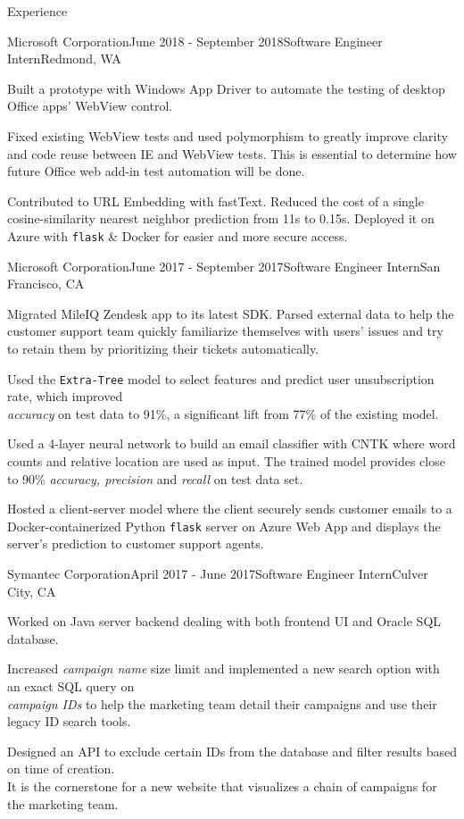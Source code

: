 \documentclass{resume} %
\begin{document}
\begin{rSection}{Experience}

\begin{rSubsection}{Microsoft Corporation}{June 2018 - September 2018}{Software Engineer Intern}{Redmond, WA}
\item Built a prototype with Windows App Driver to automate the testing of desktop Office apps' WebView control.
\item Fixed existing WebView tests and used polymorphism to greatly improve clarity and code reuse between IE and WebView tests. This is essential to determine how future Office web add-in test automation will be done.
\item Contributed to URL Embedding with fastText. Reduced the cost of a single cosine-similarity nearest neighbor prediction from 11s to 0.15s. Deployed it on Azure with \texttt{flask} \& Docker for easier and more secure access.
\end{rSubsection}

\begin{rSubsection}{Microsoft Corporation}{June 2017 - September 2017}{Software Engineer Intern}{San Francisco, CA}
\item Migrated MileIQ Zendesk app to its latest SDK. Parsed external data to help the customer support team quickly familiarize themselves with users' issues and try to retain them by prioritizing their tickets automatically.
\item Used the \texttt{Extra-Tree} model to select features and predict user unsubscription rate, which improved\\
\textit{accuracy} on test data to 91\%, a significant lift from 77\% of the existing model.
\item Used a 4-layer neural network to build an email classifier with CNTK where word counts and relative location are used as input. The trained model provides close to 90\% \textit{accuracy, precision} and \textit{recall} on test data set.
\item Hosted a client-server model where the client securely sends customer emails to a Docker-containerized Python \texttt{flask} server on Azure Web App and displays the server's prediction to customer support agents.
\end{rSubsection}

\begin{rSubsection}{Symantec Corporation}{April 2017 - June 2017}{Software Engineer Intern}{Culver City, CA}
\item Worked on Java server backend dealing with both frontend UI and Oracle SQL database.
\item Increased \textit{campaign name} size limit and implemented a new search option with an exact SQL query on\\ 
\textit{campaign IDs} to help the marketing team detail their campaigns and use their legacy ID search tools.
\item Designed an API to exclude certain IDs from the database and filter results based on time of creation.\\
It is the cornerstone for a new website that visualizes a chain of campaigns for the marketing team.
\end{rSubsection}


\end{rSection}
\end{document}
